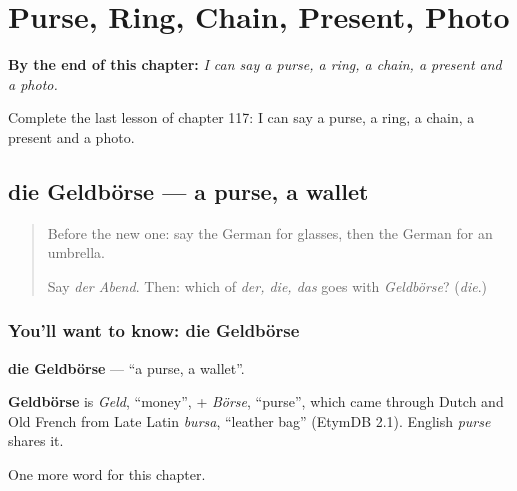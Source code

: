 
\chapter{Purse, Ring, Chain, Present, Photo}
\label{ch:ge-purse-ring-chain-present-photo}

\begin{chapteropening}
\textbf{By the end of this chapter:} \emph{I can say a purse, a ring, a chain, a present and a photo.}

Complete the last lesson of chapter 117: I can say a purse, a ring, a chain, a present and a photo.
\end{chapteropening}

\section[die Geldbörse]{die Geldbörse — a purse, a wallet}

\label{lesson:GE-C117-geldboerse}



\begin{quote}
Before the new one: say the German for glasses, then the German for an umbrella.

Say \emph{der Abend}. Then: which of \emph{der, die, das} goes with \emph{Geldbörse}? (\emph{die}.)
\end{quote}

\subsection*{You'll want to know: die Geldbörse}
\textbf{die Geldbörse} — \textquotedblleft{}a purse, a wallet\textquotedblright{}.

\begin{cousinweb}
\textbf{Geldbörse} is \emph{Geld}, \textquotedblleft{}money\textquotedblright{}, + \emph{Börse}, \textquotedblleft{}purse\textquotedblright{}, which came through Dutch and Old French from Late Latin \emph{bursa}, \textquotedblleft{}leather bag\textquotedblright{} (EtymDB 2.1). English \emph{purse} shares it.
\end{cousinweb}

\begin{grammarlens}[title={What you've built}]
One more word for this chapter.
\end{grammarlens}

